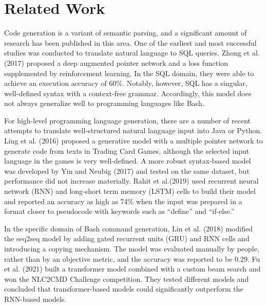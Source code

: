 \section{Related Work}
Code generation is a variant of semantic parsing, and a significant amount of
research has been published in this area. One of the earliest and most
successful studies was conducted to translate natural language to SQL
queries. Zhong et al. (2017) \cite{zhong2017seq2sql} proposed a deep
augmented pointer network and a loss function supplemented by reinforcement
learning. In the SQL domain, they were able to achieve an execution accuracy of
60\%. Notably, however, SQL has a singular, well-defined syntax with a
context-free grammar. Accordingly, this model does not always generalize well
to programming languages like Bash.
\par
For high-level programming language generation, there are a number of recent
attempts to translate well-structured natural language input into Java or
Python.  Ling et al. (2016) \cite{ling2016latent} proposed a generative model
with a multiple pointer network to generate code from texts in Trading Card
Games, although the selected input language in the games is very well-defined. A
more robust syntax-based model was developed by Yin and Neubig (2017)
\cite{yin2017syntactic} and tested on the same dataset, but performance did not
increase materially. Rahit et al.(2019) \cite{rahit2019machine} used recurrent
neural network (RNN) and long-short term memory (LSTM) cells to build their model and
reported an accuracy as high as 74\% when the input was prepared in a format
closer to pseudocode with keywords such as ``define'' and ``if-else.''
\par
In the specific domain of Bash command generation, Lin et al. (2018)
\cite{lin2018nl2bash} modified the seq2seq model by adding gated recurrent
units (GRU) and RNN cells and introducing a copying mechanism. The model was
evaluated manually by people, rather than by an objective metric, and the
accuracy was reported to be 0.29. Fu et al. (2021) \cite{Fu2021ATransform}
built a transformer model combined with a custom beam search and won the NLC2CMD
Challenge competition. They tested different models and concluded that
transformer-based models could significantly outperform the RNN-based models.
